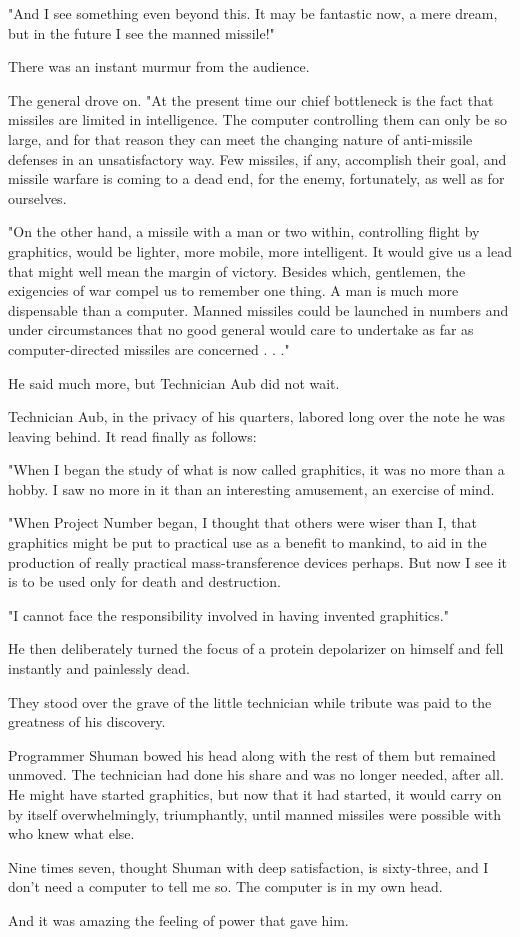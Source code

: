 \documentclass{amsart}
\begin{document}
"And I see something even beyond this. It may be fantastic now, a mere
dream, but in the future I see the manned missile!"

There was an instant murmur from the audience.

The general drove on. "At the present time our chief bottleneck is the
fact that missiles are limited in intelligence. The computer
controlling them can only be so large, and for that reason they can
meet the changing nature of anti-missile defenses in an unsatisfactory
way. Few missiles, if any, accomplish their goal, and missile warfare
is coming to a dead end, for the enemy, fortunately, as well as for
ourselves.

"On the other hand, a missile with a man or two within, controlling
flight by graphitics, would be lighter, more mobile, more intelligent.
It would give us a lead that might well mean the margin of victory.
Besides which, gentlemen, the exigencies of war compel us to remember
one thing. A man is much more dispensable than a computer. Manned
missiles could be launched in numbers and under circumstances that no
good general would care to undertake as far as computer-directed
missiles are concerned . . ."

He said much more, but Technician Aub did not wait.

Technician Aub, in the privacy of his quarters, labored long over the
note he was leaving behind. It read finally as follows:

"When I began the study of what is now called graphitics, it was no
more than a hobby. I saw no more in it than an interesting amusement,
an exercise of mind.

"When Project Number began, I thought that others were wiser than I,
that graphitics might be put to practical use as a benefit to mankind,
to aid in the production of really practical mass-transference devices
perhaps. But now I see it is to be used only for death and
destruction.

"I cannot face the responsibility involved in having invented
graphitics."

He then deliberately turned the focus of a protein depolarizer on
himself and fell instantly and painlessly dead.

They stood over the grave of the little technician while tribute was
paid to the greatness of his discovery.

Programmer Shuman bowed his head along with the rest of them but
remained unmoved. The technician had done his share and was no longer
needed, after all. He might have started graphitics, but now that it
had started, it would carry on by itself overwhelmingly, triumphantly,
until manned missiles were possible with who knew what else.

Nine times seven, thought Shuman with deep satisfaction, is
sixty-three, and I don't need a computer to tell me so. The computer
is in my own head.

And it was amazing the feeling of power that gave him.
\end{document}
